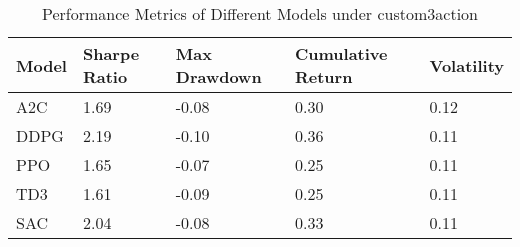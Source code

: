 \begin{table}[H]
\centering
\begin{tabular}{|l|l|l|l|l|}
\hline
Model & Sharpe Ratio & Max Drawdown & Cumulative Return & Volatility \\ \hline
A2C & 1.69 & -0.08 & 0.30 & 0.12 \\ \hline
DDPG & 2.19 & -0.10 & 0.36 & 0.11 \\ \hline
PPO & 1.65 & -0.07 & 0.25 & 0.11 \\ \hline
TD3 & 1.61 & -0.09 & 0.25 & 0.11 \\ \hline
SAC & 2.04 & -0.08 & 0.33 & 0.11 \\ \hline
\end{tabular}
\caption{Performance Metrics of Different Models under custom3action}
\label{tab:metrics}
\end{table}